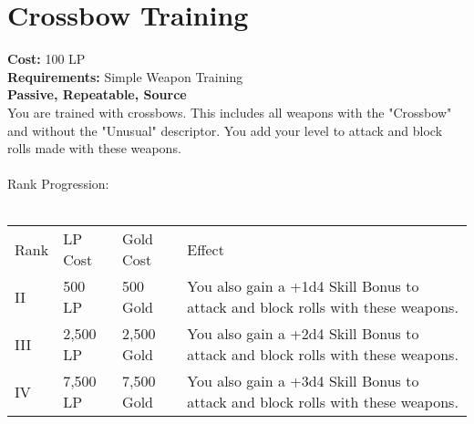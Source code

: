 \section{Crossbow Training}\label{perk:crossbowTraining}
\textbf{Cost:} 100 LP\\
\textbf{Requirements:} Simple Weapon Training\\
\textbf{Passive, Repeatable, Source}\\
You are trained with crossbows.
This includes all weapons with the "Crossbow" and without the "Unusual" descriptor.
You add your level to attack and block rolls made with these weapons.\\
\\
Rank Progression:\\
\\
\begin{longtable}{l | l | l | p{9cm}}
	Rank & LP Cost & Gold Cost & Effect\\
	II & 500 LP & 500 Gold & You also gain a +1d4 Skill Bonus to attack and block rolls with these weapons.\\
	III & 2,500 LP & 2,500 Gold & You also gain a +2d4 Skill Bonus to attack and block rolls with these weapons.\\
	IV & 7,500 LP & 7,500 Gold & You also gain a +3d4 Skill Bonus to attack and block rolls with these weapons.\\
\end{longtable}